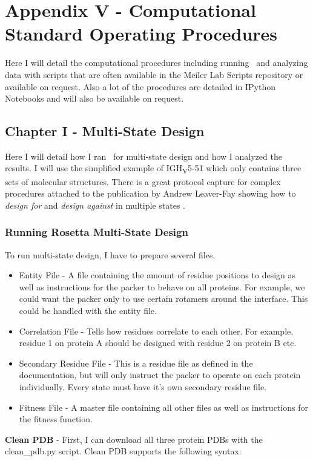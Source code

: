 \section{Appendix V - Computational Standard Operating Procedures}
\label{sec:appenixV}
Here I will detail the computational procedures including running \rosetta~and analyzing data with scripts that are often available in the Meiler Lab Scripts repository or available on request. Also a lot of the procedures are detailed in IPython Notebooks and will also be available on request.
\subsection{Chapter I - Multi-State Design}
Here I will detail how I ran \rosettadesign~for multi-state design and how I analyzed the results. I will use the simplified example of IGH\textsubscript{V}5-51 which only contains three sets of molecular structures. There is a great protocol capture for complex procedures attached to the publication by Andrew Leaver-Fay showing how to \textit{design for} and \textit{design against} in multiple states \citep{LeaverFay:2011ji}.
\subsubsection{Running Rosetta Multi-State Design}
To run multi-state design, I have to prepare several files.

\begin{itemize}
\item Entity File - A file containing the amount of residue positions to design as well as instructions for the packer to behave on all proteins. For example, we could want the packer only to use certain rotamers around the interface. This could be handled with the entity file.
\item Correlation File - Tells how residues correlate to each other. For example, residue 1 on protein A should be designed with residue 2 on protein B etc.
\item Secondary Residue File - This is a residue file as defined in the documentation, but will only instruct the packer to operate on each protein individually. Every state must have it's own secondary residue file.
\item Fitness File - A master file containing all other files as well as instructions for the fitness function.
\end{itemize}

\textbf{Clean PDB} - First, I can download all three protein PDBs with the clean\_pdb.py script. Clean PDB supports the following syntax:


